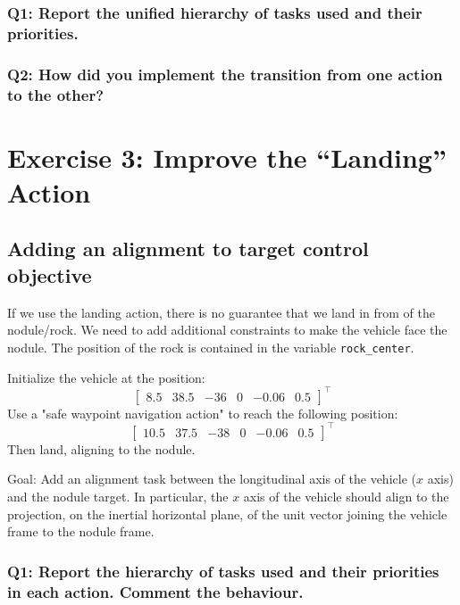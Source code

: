 \documentclass{article}
\begin{document}
\subsubsection{Q1: Report the unified hierarchy of tasks used and their priorities.}

\subsubsection{Q2: How did you implement the transition from one action to the other?}

\clearpage

\section{Exercise 3: Improve the “Landing” Action}
\subsection{Adding an alignment to target control objective}
If we use the landing action, there is no guarantee that we land in from of the nodule/rock. We need to add additional constraints to make the vehicle face the nodule. The position of the rock is contained in the variable \texttt{rock\_center}.

Initialize the vehicle at the position:
\begin{displaymath}
\begin{bmatrix} 8.5 & 38.5 & -36 & 0 & -0.06 & 0.5 \end{bmatrix}^\top
\end{displaymath}
Use a "safe waypoint navigation action" to reach the following position:
\begin{displaymath}
\begin{bmatrix} 10.5 & 37.5 & -38 & 0 & -0.06 & 0.5 \end{bmatrix}^\top
\end{displaymath}
Then land, aligning to the nodule.

Goal: Add an alignment task between the longitudinal axis of the vehicle ($x$ axis) and the nodule target. In particular, the $x$ axis of the vehicle should align to the projection, on the inertial horizontal plane, of the unit vector joining the vehicle frame to the nodule frame.

\subsubsection{Q1: Report the hierarchy of tasks used and their priorities in each action. Comment the behaviour.}
\end{document}
